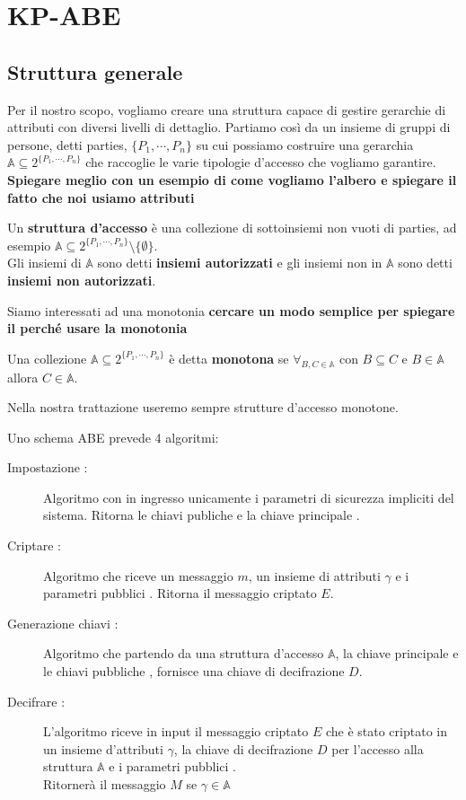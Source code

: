 \chapter{KP-ABE}
\section{Struttura generale}


Per il nostro scopo, vogliamo creare una struttura capace di gestire gerarchie di attributi con diversi livelli di dettaglio. Partiamo così da un insieme di gruppi di persone, detti parties, $\{P_1, \cdots , P_n \}$ su cui possiamo costruire una gerarchia $\mathbb{A} \subseteq 2^{\{P_1,\cdots,P_n\}}$ che raccoglie le varie tipologie d'accesso che vogliamo garantire.\\
\textbf{Spiegare meglio con un esempio di come vogliamo l'albero e spiegare il fatto che noi usiamo attributi}

\begin{defi}
Un \textbf{struttura d'accesso} è una collezione di sottoinsiemi non vuoti di parties, ad esempio $\mathbb{A} \subseteq 2^{\{ P_1,\cdots,P_n \}} \setminus \{ \emptyset \}$.\\
Gli insiemi di $\mathbb{A}$ sono detti \textbf{insiemi autorizzati} e gli insiemi non in $\mathbb{A}$ sono detti \textbf{insiemi non autorizzati}.
\end{defi}

Siamo interessati ad una monotonia \textbf{cercare un modo semplice per spiegare il perché usare la monotonia}


\begin{defi}
Una collezione $\mathbb{A} \subseteq 2^{\{P_1,\cdots,P_n\}}$ è detta \textbf{monotona} se $\forall_{B,C \in \mathbb{A}}$ con $B \subseteq C$ e $B \in \mathbb{A}$ allora $C \in \mathbb{A}$.
\end{defi}

Nella nostra trattazione useremo sempre strutture d'accesso monotone.

Uno schema ABE prevede 4 algoritmi:
\begin{description}
\item[Impostazione :] Algoritmo con in ingresso unicamente i parametri di sicurezza impliciti del sistema. Ritorna le chiavi publiche \pk e la chiave principale \mk.
\item[Criptare :] Algoritmo che riceve un messaggio $m$, un insieme di attributi $\gamma$ e i parametri pubblici \pk. Ritorna il messaggio criptato $E$.
\item[Generazione chiavi :] Algoritmo che partendo da una struttura d'accesso $\mathbb{A}$, la chiave principale \mk e le chiavi pubbliche , fornisce una chiave di decifrazione $D$.
\item[Decifrare :]L'algoritmo riceve in input il messaggio criptato $E$ che è stato criptato in un insieme d'attributi $\gamma$, la chiave di decifrazione $D$ per l'accesso alla struttura $\mathbb{A}$ e i parametri pubblici \pk.\\
Ritornerà il messaggio $M$ se $\gamma \in \mathbb{A}$
\end{description}

